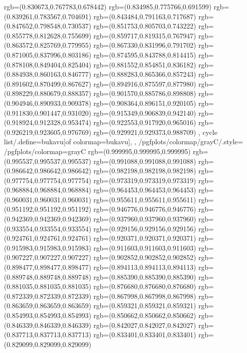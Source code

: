 {{{			rgb=(0.830673,0.767783,0.678442)
			rgb=(0.834985,0.775766,0.691599)
			rgb=(0.839261,0.783567,0.704691)
			rgb=(0.843484,0.791163,0.717687)
			rgb=(0.847652,0.798548,0.730537)
			rgb=(0.851753,0.805703,0.743222)
			rgb=(0.855778,0.812628,0.755699)
			rgb=(0.859717,0.819315,0.767947)
			rgb=(0.863572,0.825769,0.779955)
			rgb=(0.867330,0.831996,0.791702)
			rgb=(0.871005,0.837996,0.803186)
			rgb=(0.874595,0.843788,0.814415)
			rgb=(0.878108,0.849404,0.825404)
			rgb=(0.881552,0.854851,0.836182)
			rgb=(0.884938,0.860163,0.846777)
			rgb=(0.888283,0.865366,0.857243)
			rgb=(0.891602,0.870499,0.867627)
			rgb=(0.894916,0.875597,0.877980)
			rgb=(0.898229,0.880679,0.888357)
			rgb=(0.901570,0.885786,0.898808)
			rgb=(0.904946,0.890933,0.909378)
			rgb=(0.908364,0.896151,0.920105)
			rgb=(0.911830,0.901447,0.931020)
			rgb=(0.915349,0.906839,0.942140)
			rgb=(0.918924,0.912328,0.953474)
			rgb=(0.922553,0.917920,0.965016)
			rgb=(0.926219,0.923605,0.976769)
			rgb=(0.929921,0.929373,0.988709)
		},
	cycle list/.define={bukavu}{[of colormap=bukavu]},
	},
	/pgfplots/colormap/grayC/.style={
		/pgfplots/colormap={grayC}{%
			rgb=(0.999995,0.999995,0.999995)
			rgb=(0.995537,0.995537,0.995537)
			rgb=(0.991088,0.991088,0.991088)
			rgb=(0.986642,0.986642,0.986642)
			rgb=(0.982198,0.982198,0.982198)
			rgb=(0.977754,0.977754,0.977754)
			rgb=(0.973319,0.973319,0.973319)
			rgb=(0.968884,0.968884,0.968884)
			rgb=(0.964453,0.964453,0.964453)
			rgb=(0.960031,0.960031,0.960031)
			rgb=(0.955611,0.955611,0.955611)
			rgb=(0.951192,0.951192,0.951192)
			rgb=(0.946776,0.946776,0.946776)
			rgb=(0.942369,0.942369,0.942369)
			rgb=(0.937960,0.937960,0.937960)
			rgb=(0.933554,0.933554,0.933554)
			rgb=(0.929156,0.929156,0.929156)
			rgb=(0.924761,0.924761,0.924761)
			rgb=(0.920371,0.920371,0.920371)
			rgb=(0.915983,0.915983,0.915983)
			rgb=(0.911603,0.911603,0.911603)
			rgb=(0.907227,0.907227,0.907227)
			rgb=(0.902852,0.902852,0.902852)
			rgb=(0.898477,0.898477,0.898477)
			rgb=(0.894113,0.894113,0.894113)
			rgb=(0.889748,0.889748,0.889748)
			rgb=(0.885390,0.885390,0.885390)
			rgb=(0.881035,0.881035,0.881035)
			rgb=(0.876680,0.876680,0.876680)
			rgb=(0.872339,0.872339,0.872339)
			rgb=(0.867998,0.867998,0.867998)
			rgb=(0.863659,0.863659,0.863659)
			rgb=(0.859321,0.859321,0.859321)
			rgb=(0.854993,0.854993,0.854993)
			rgb=(0.850662,0.850662,0.850662)
			rgb=(0.846339,0.846339,0.846339)
			rgb=(0.842027,0.842027,0.842027)
			rgb=(0.837713,0.837713,0.837713)
			rgb=(0.833401,0.833401,0.833401)
			rgb=(0.829099,0.829099,0.829099)
}}}
